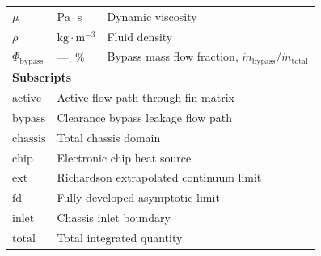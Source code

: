 \documentclass[preprint,12pt]{elsarticle}
\begin{document}
\begin{longtable}{llp{}}
$\mu$ & $\mathrm{Pa}\cdot\mathrm{s}$ & Dynamic viscosity \\
$\rho$ & $\mathrm{kg}\cdot\mathrm{m}^{-3}$ & Fluid density \\
$\Phi_{\mathrm{bypass}}$ & ---, \% & Bypass mass flow fraction, $\dot{m}_{\mathrm{bypass}} / \dot{m}_{\mathrm{total}}$ \\
\hline
\multicolumn{3}{l}{\textbf{Subscripts}} \\
$\mathrm{active}$ & \multicolumn{2}{l}{Active flow path through fin matrix} \\
$\mathrm{bypass}$ & \multicolumn{2}{l}{Clearance bypass leakage flow path} \\
$\mathrm{chassis}$ & \multicolumn{2}{l}{Total chassis domain} \\
$\mathrm{chip}$ & \multicolumn{2}{l}{Electronic chip heat source} \\
$\mathrm{ext}$ & \multicolumn{2}{l}{Richardson extrapolated continuum limit} \\
$\mathrm{fd}$ & \multicolumn{2}{l}{Fully developed asymptotic limit} \\
$\mathrm{inlet}$ & \multicolumn{2}{l}{Chassis inlet boundary} \\
$\mathrm{total}$ & \multicolumn{2}{l}{Total integrated quantity} \\
\hline
\end{longtable}



\end{document}
